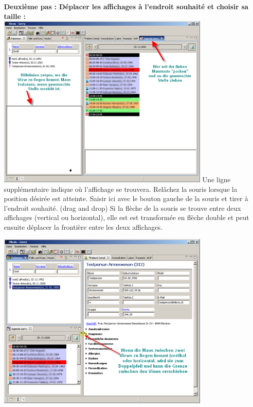 \bigskip
\pagebreak[3]
\textbf{Deuxième pas : Déplacer les affichages à l'endroit souhaité et choisir sa taille :}\\

   \includegraphics[width=0.8\textwidth]{images/agendagewaehlt}
Une ligne supplémentaire indique où l'affichage se trouvera. Relâchez la souris lorsque la position désirée est atteinte.
Saisir ici avec le bouton gauche de la souris et tirer à l'endroit souhaité. (drag and drop)
Si la flèche de la souris se trouve entre deux affichages (vertical ou horizontal), elle est est transformée en flèche double et peut ensuite déplacer la frontière entre les deux affichages.

   \includegraphics[width=0.8\textwidth]{images/agendaanpassen}

